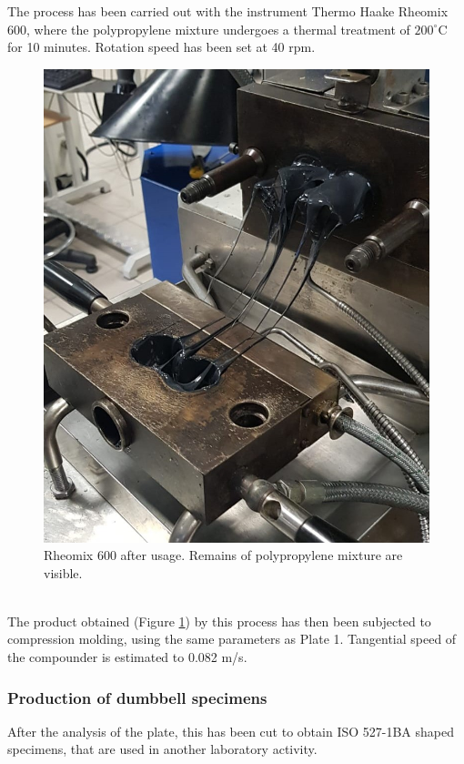 \documentclass[a4paper, 11pt]{article}
\begin{document}
The process has been carried out with the instrument Thermo Haake Rheomix 600, where the polypropylene mixture undergoes a thermal treatment of $200^\circ$C for 10 minutes. Rotation speed has been set at 40 rpm.
\begin{figure}[htp]
	\centering
	\includegraphics[scale=0.3]
	{PHOTO-2019-05-23-17-37-35.jpg}
	\caption{Rheomix 600 after usage. Remains of polypropylene mixture are visible.}
	\label{fig:rheo}
\end{figure}\\
The product obtained (Figure \ref{fig:rheo}) by this process has then been subjected to compression molding, using the same parameters as Plate 1. Tangential speed of the compounder is estimated to 0.082 m/s.

\subsubsection{Production of dumbbell specimens}

After the analysis of the plate, this has been cut to obtain ISO 527-1BA shaped specimens, that are used in another laboratory activity.     
\end{document}
